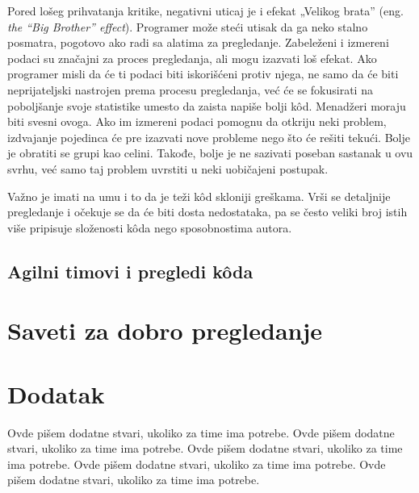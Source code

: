 \documentclass[a4paper]{article}
\begin{document}
Pored lošeg prihvatanja kritike, negativni uticaj je i efekat „Velikog brata” (eng. \emph{the “Big Brother” effect}). \cite{bkspcr} Programer može steći utisak da ga neko stalno posmatra, pogotovo ako radi sa alatima za pregledanje. Zabeleženi i izmereni podaci su značajni za proces pregledanja, ali mogu izazvati loš efekat. Ako programer misli da će ti podaci biti iskorišćeni protiv njega, ne samo da će biti neprijateljski nastrojen prema procesu pregledanja, već će se fokusirati na poboljšanje svoje statistike umesto da zaista napiše bolji kôd. Menadžeri moraju biti svesni ovoga. Ako im izmereni podaci pomognu da otkriju neki problem, izdvajanje pojedinca će pre izazvati nove probleme nego što će rešiti tekući. Bolje je obratiti se grupi kao celini. Takođe, bolje je ne sazivati poseban sastanak u ovu svrhu, već samo taj problem uvrstiti u neki uobičajeni postupak. \cite{ibm}

Važno je imati na umu i to da je teži kôd skloniji greškama. Vrši se detaljnije pregledanje i očekuje se da će biti dosta nedostataka, pa se često veliki broj istih više pripisuje složenosti kôda nego sposobnostima autora.

\subsection{Agilni timovi i pregledi kôda}

\section{Saveti za dobro pregledanje}

\appendix
 


\appendix
\section{Dodatak}
Ovde pišem dodatne stvari, ukoliko za time ima potrebe.
Ovde pišem dodatne stvari, ukoliko za time ima potrebe.
Ovde pišem dodatne stvari, ukoliko za time ima potrebe.
Ovde pišem dodatne stvari, ukoliko za time ima potrebe.
Ovde pišem dodatne stvari, ukoliko za time ima potrebe.
\end{document}
